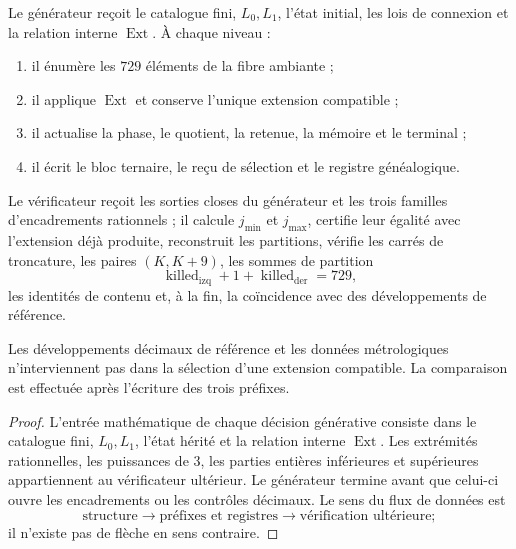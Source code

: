 \begin{definition}
Le générateur reçoit le catalogue fini, \(L_0,L_1\), l’état initial, les
lois de connexion et la relation interne \(\operatorname{Ext}\). À chaque niveau :
\begin{enumerate}
 \item il énumère les \(729\) éléments de la fibre ambiante ;
 \item il applique \(\operatorname{Ext}\) et conserve l’unique extension compatible ;
 \item il actualise la phase, le quotient, la retenue, la mémoire et le terminal ;
 \item il écrit le bloc ternaire, le reçu de sélection et le registre généalogique.
\end{enumerate}
\end{definition}

\begin{definition}
Le vérificateur reçoit les sorties closes du générateur et les trois familles
d’encadrements rationnels ; il calcule \(j_{\min}\) et \(j_{\max}\), certifie leur
égalité avec l’extension déjà produite, reconstruit les
partitions, vérifie les carrés de troncature, les paires
\((K,K+9)\), les sommes de partition
\[
 \operatorname{killed}_{\mathrm{izq}}+1+\operatorname{killed}_{\mathrm{der}}=729,
\]
les identités de contenu et, à la fin, la coïncidence avec des développements de référence.
\end{definition}

\begin{theorem}
\label{gfp:b:thm:aislamiento-datos-objetivo-precision}
Les développements décimaux de référence et les données métrologiques
n’interviennent pas dans la sélection d’une extension compatible. La comparaison est
effectuée après l’écriture des trois préfixes.
\end{theorem}

\begin{proof}
L’entrée mathématique de chaque décision générative consiste dans le catalogue
fini, \(L_0,L_1\), l’état hérité et la relation interne
\(\operatorname{Ext}\). Les extrémités rationnelles, les puissances de \(3\), les parties entières inférieures et
supérieures appartiennent au vérificateur ultérieur. Le générateur termine avant que
celui-ci ouvre les encadrements ou les contrôles décimaux. Le sens du flux de
données est
\[
 \text{structure}\longrightarrow
 \text{préfixes et registres}\longrightarrow
 \text{vérification ultérieure};
\]
il n’existe pas de flèche en sens contraire.
\end{proof}


